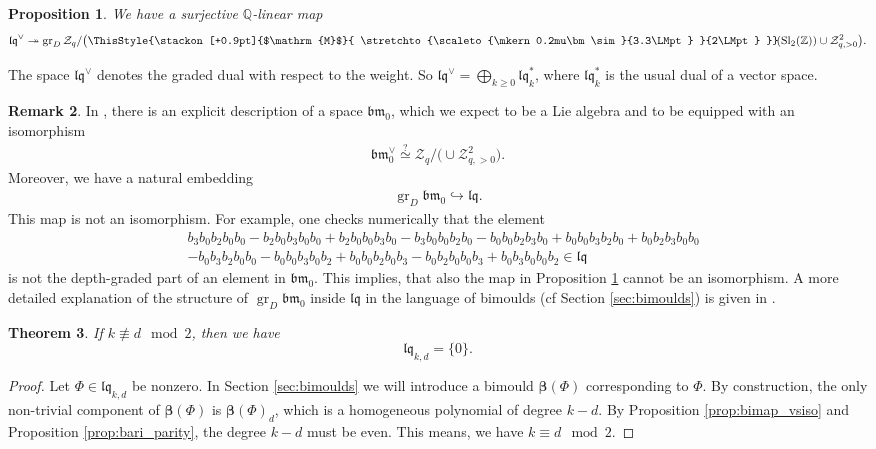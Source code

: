\documentclass[12pt,reqno]{amsart}
\newtheorem{thm}{Theorem}[section]
\newtheorem{prop}[thm]{Proposition}
\numberwithin{equation}{section}
\theoremstyle{definition}
\newtheorem{rem}[thm]{Remark}
\newcommand{\medtildeM}{ \ThisStyle{\stackon[+0.9pt]{$\mathrm{M}$}{ \stretchto{\scaleto{\mkern0.2mu\bm\sim}{3.3\LMpt} }{2\LMpt} }}}
\newcommand{\ZZ}{\mathbb{Z}}
\newcommand{\QQ}{\mathbb{Q}}
\newcommand{\quasimod}{\ensuremath{\medtildeM\!(\operatorname{Sl}_2(\ZZ))}}
\newcommand{\Z}{\mathcal{Z}}
\newcommand{\grD}{\operatorname{gr}_D}
\newcommand{\bimap}{\boldsymbol{\beta}}
\newcommand{\lqq}{\mathfrak{lq}}
\newcommand{\bmzero}{\mathfrak{bm}_0}
\begin{document}
\begin{prop} \label{prop:surj_lqdual_indec} We have a surjective $\QQ$-linear map
\begin{align*} 
\lqq^\vee \twoheadrightarrow \grD\Z_q/\big(\quasimod\cup \Z_{q,>0}^2\big).
\end{align*}
\end{prop}

The space $\lqq^\vee$ denotes the graded dual with respect to the weight. So $\lqq^\vee=\bigoplus_{k\geq0} \lqq_k^*$, where $\lqq_k^*$ is the usual dual of a vector space. 

\begin{rem} \label{rem:lq_grDZ_q_not_inj}
In \cite{Bu23}, there is an explicit description of a space $\bmzero$, which we expect to be a Lie algebra and to be equipped with an isomorphism
\begin{align*}
\bmzero^\vee\overset{?}{\simeq} \Z_q/\big(\cup \Z_{q,>0}^2\big).
\end{align*} 
Moreover, we have a natural embedding
\begin{align*} 
\grD\bmzero\hookrightarrow\lqq.
\end{align*}
This map is not an isomorphism. For example, one checks numerically that the element
\begin{align*}
&b_3b_0b_2b_0b_0-b_2b_0b_3b_0b_0+b_2b_0b_0b_3b_0-b_3b_0b_0b_2b_0-b_0b_0b_2b_3b_0+b_0b_0b_3b_2b_0+b_0b_2b_3b_0b_0 \\	&-b_0b_3b_2b_0b_0-b_0b_0b_3b_0b_2+b_0b_0b_2b_0b_3-b_0b_2b_0b_0b_3+b_0b_3b_0b_0b_2 \in\lqq
\end{align*}
is not the depth-graded part of an element in $\bmzero$. This implies, that also the map in Proposition \ref{prop:surj_lqdual_indec} cannot be an isomorphism. A more detailed explanation of the structure of $\grD\bmzero$ inside $\lqq$ in the language of bimoulds (cf Section \ref{sec:bimoulds}) is given in \cite{Kü19}.
\end{rem} 

\begin{thm} \label{thm:lq_parity} If $k\not\equiv d \mod 2$, then we have
\[\lqq_{k,d}=\{0\}.\]
\end{thm}

\begin{proof} Let $\Phi\in \lqq_{k,d}$ be nonzero. In Section \ref{sec:bimoulds} we will introduce a bimould $\bimap(\Phi)$ corresponding to $\Phi$. By construction, the only non-trivial component of $\bimap(\Phi)$ is $\bimap(\Phi)_d$, which is a homogeneous polynomial of degree $k-d$. By Proposition \ref{prop:bimap_vsiso} and Proposition \ref{prop:bari_parity}, the degree $k-d$ must be even. This means, we have $k\equiv d \mod 2$.
\end{proof}
\end{document}

